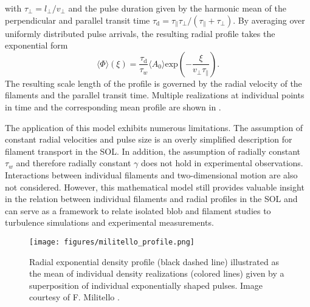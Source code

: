 with $\tau_\perp = l_\perp/v_\perp$ and the pulse duration given by the harmonic mean of the perpendicular and parallel transit time $\tau_\mathrm{d} = \tau_\parallel\tau_\perp/(\tau_\parallel+\tau_\perp)$. By averaging over uniformly distributed pulse arrivals, the resulting radial profile takes the exponential form
\begin{equation}
	\langle\Phi\rangle(\xi) = \frac{\tau_\mathrm{d}}{\tau_w}\langle A_0\rangle\mathrm{exp}\left(-\frac{\xi}{v_\perp\tau_\parallel}\right).
\end{equation}
The resulting scale length of the profile is governed by the radial velocity of the filaments and the parallel transit time. Multiple realizations at individual points in time and the corresponding mean profile are shown in . 

The application of this model exhibits numerous limitations. The assumption of constant radial velocities and pulse size is an overly simplified description for filament transport in the SOL. In addition, the assumption of radially constant $\tau_w$ and therefore radially constant $\gamma$ does not hold in experimental observations. Interactions between individual filaments and two-dimensional motion are also not considered. However, this mathematical model still provides valuable insight in the relation between individual filaments and radial profiles in the SOL and can serve as a framework to relate isolated blob and filament studies to turbulence simulations and experimental measurements. 

\begin{figure}[t]
	\centering
	\texttt{[image: figures/militello\_profile.png]}
	\caption{Radial exponential density profile (black dashed line) illustrated as the mean of individual density realizations (colored lines) given by a superposition of individual exponentially shaped pulses. Image courtesy of F. Militello \cite{militello_profiles}.}
	\label{Fig:militello}
\end{figure}

